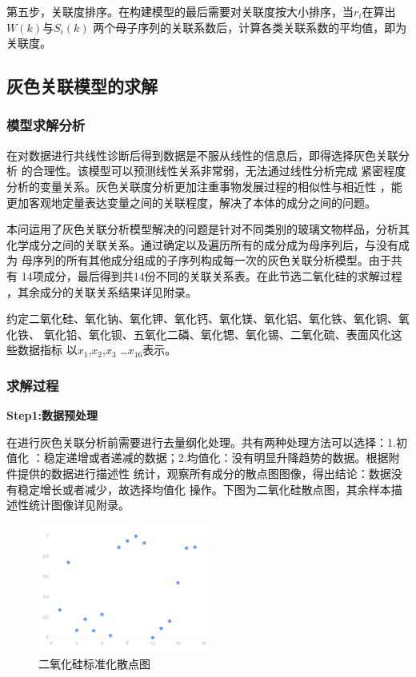 \documentclass[UTF8]{ctexart}
\begin{document}
第五步，关联度排序。在构建模型的最后需要对关联度按大小排序，当$r_{i}$在算出$W(k)$与$S_{i}(k)$
两个母子序列的关联系数后，计算各类关联系数的平均值，即为关联度。

\subsection{灰色关联模型的求解}
\subsubsection{模型求解分析}
在对数据进行共线性诊断后得到数据是不服从线性的信息后，即得选择灰色关联分析
的合理性。该模型可以预测线性关系非常弱，无法通过线性分析完成
紧密程度分析的变量关系。灰色关联度分析更加注重事物发展过程的相似性与相近性
，能更加客观地定量表达变量之间的关联程度，解决了本体的成分之间的问题。

本问运用了灰色关联分析模型解决的问题是针对不同类别的玻璃文物样品，分析其
化学成分之间的关联关系。通过确定以及遍历所有的成分成为母序列后，与没有成为
母序列的所有其他成分组成的子序列构成每一次的灰色关联分析模型。由于共有
14项成分，最后得到共14份不同的关联关系表。在此节选二氧化硅的求解过程
，其余成分的关联关系结果详见附录。

约定二氧化硅、氧化钠、氧化钾、氧化钙、氧化镁、氧化铝、氧化铁、氧化铜、氧化铁、
氧化铅、氧化钡、五氧化二磷、氧化锶、氧化锡、二氧化硫、表面风化这些数据指标
以$x_1$,$x_2$,$x_3$ \dots $x_{16}$表示。

\subsubsection{求解过程}
\textbf{Step1:数据预处理}

在进行灰色关联分析前需要进行去量纲化处理。共有两种处理方法可以选择：1.初值化
：稳定递增或者递减的数据；2.均值化：没有明显升降趋势的数据。根据附件提供的数据进行描述性
统计，观察所有成分的散点图图像，得出结论：数据没有稳定增长或者减少，故选择均值化
操作。下图为二氧化硅散点图，其余样本描述性统计图像详见附录。
\begin{figure}[H]\centering
	\includegraphics[width=0.5\textwidth]{img/二氧化硅标准化散点图.png} %
	\caption{二氧化硅标准化散点图} %
	\label{fig:figure 3} %
\end{figure}
\end{document}
